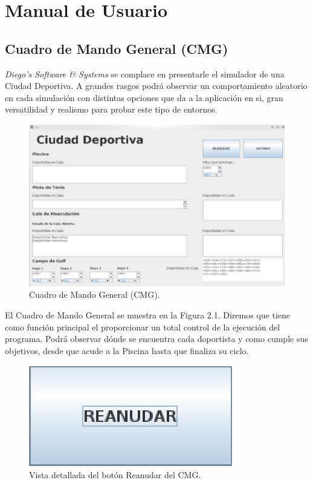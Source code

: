 \chapter{Manual de Usuario}

\section{Cuadro de Mando General (CMG)}

\textit{Diego's Software \& Systems} se complace en presentarle el simulador de una
Ciudad Deportiva. A grandes rasgos podr\'a observar un comportamiento aleatorio
en cada simulaci\'on con distintas opciones que da a la aplicaci\'on en si, gran
versatilidad y realismo para probar este tipo de entornos.

\begin{figure}[h]
\begin{center}
 \includegraphics{./images/generalCiudadDeportiva.eps}
\end{center}
\caption{Cuadro de Mando General (CMG).}
\end{figure}


El Cuadro de Mando General se muestra en la Figura 2.1. Diremos que tiene como
funci\'on principal el proporcionar un total control de la ejecuci\'on del
programa. Podr\'a observar d\'onde se encuentra cada doportista y como cumple
sus objetivos, desde que acude a la Piscina hasta que finaliza su ciclo. 

\begin{figure}[h]
\begin{center}
 \includegraphics{./images/botonReanudar.eps}
\end{center}
\caption{Vista detallada del bot\'on Reanudar del CMG.}
\end{figure}


